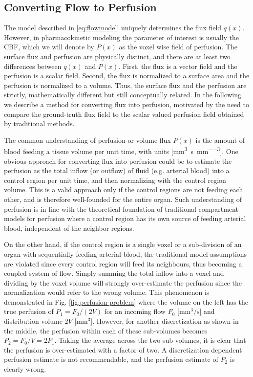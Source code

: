\documentclass[journal,twocolumn]{IEEEtran}
\newcommand{\Perf}{P}
\newcommand{\Flow}{F}
\newcommand{\siFmm}{\milli\meter\cubed\per\second}
\newcommand{\siQmm}{\milli\meter\cubed\per\second\per\milli\meter\cubed}
\newcommand{\simm}{\milli\meter\cubed}
\begin{document}
	\subsection{Converting Flow to Perfusion}\label{sec:flux2perf}
	The model described in \eqref{eq:flowmodel} uniquely determines the flux field $q(x)$. 
	However, in pharmacokinetic modeling the parameter of interest is usually the CBF, which we will denote by $\Perf (x)$ as the voxel wise field of perfusion. The surface flux and perfusion are physically distinct, and there are at least two differences between $q(x)$ and $\Perf (x)$. 
	First, the flux is a vector field and the perfusion is a scalar field. 
	Second, the flux is normalized to a surface area and the perfusion is normalized to a volume. 
	Thus, the surface flux and the perfusion are strictly, mathematically different but still conceptually related. 
	In the following we describe a method for converting flux into perfusion, motivated by the need to compare the ground-truth flux field to the scalar valued perfusion field obtained by traditional methods.

	The common understanding of perfusion or volume flux $\Perf (x)$ is the amount of blood feeding a tissue volume per unit time, with units [\si{\siQmm}]. 
	One obvious approach for converting flux into perfusion could be to estimate the perfusion as the total inflow (or outflow) of fluid (e.g. arterial blood) into a control region per unit time, and then normalizing with the control region volume. 
	This is a valid approach only if the control regions are not feeding each other, and is therefore well-founded for the entire organ. 
	Such understanding of perfusion is in line with the theoretical foundation of traditional compartment models for perfusion where a control region has its own source of feeding arterial blood, independent of the neighbor regions. 
	
	On the other hand, if the control region is a single voxel or a sub-division of an organ with sequentially feeding arterial blood, the traditional model assumptions are violated since every control region will feed its neighbours, thus becoming a coupled system of flow. 
	Simply summing the total inflow into a voxel and dividing by the voxel volume will strongly over-estimate the perfusion since the normalization would refer to the wrong volume. 
	This phenomenon is demonstrated in Fig. \ref{fig:perfusion-problem} where the volume on the left has the true perfusion of $\Perf_{1} = \Flow_0 /(2V)$ for an incoming flow $\Flow_0$ [$\si{\siFmm}$] and distribution volume $2V$ [$\si{\simm}$]. 
	However, for another discretization as shown in the middle, the perfusion within each of these sub-volumes becomes $\Perf_{2} = F_0/V = 2\Perf_{1}$. 
	Taking the average across the two sub-volumes, it is clear that the perfusion is over-estimated with a factor of two. 
	A discretization dependent perfusion estimate is not recommendable, and the perfusion estimate of $\Perf_{2}$ is clearly wrong. 
\end{document}
